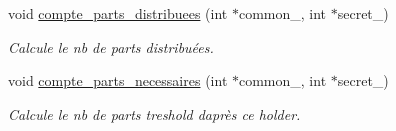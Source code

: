 \begin{DoxyCompactItemize}
void \hyperlink{classt__holder_aa79a75527ffcb877408da759d7b3bbd1}{compte\+\_\+parts\+\_\+distribuees} (int $\ast$common\+\_\+, int $\ast$secret\+\_\+)
\begin{DoxyCompactList}\small\item\em Calcule le nb de parts distribuées. \end{DoxyCompactList}\item 
void \hyperlink{classt__holder_aa69ee8318b98c9b2710406a058592e5d}{compte\+\_\+parts\+\_\+necessaires} (int $\ast$common\+\_\+, int $\ast$secret\+\_\+)
\begin{DoxyCompactList}\small\item\em Calcule le nb de parts treshold d\textquotesingle{}après ce holder. \end{DoxyCompactList}\end{DoxyCompactItemize}
